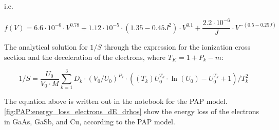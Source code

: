 
i.e.

\begin{equation}
    \label{eq:theory:quantitative:pap:calculation_of_F:dE_d_rho_s:one_over_f_2}
    f(V) = 6.6 \cdot 10^{-6}\cdot V^{0.78} + 1.12\cdot 10^{-5}\cdot (1.35 - 0.45 J^2) \cdot V^{0.1} + \frac{2.2 \cdot 10^{-6}}{J} \cdot V^{-(0.5-0.25J)}
\end{equation}




The analytical solution for $1/S$ through the expression for the ionization cross section and the deceleration of the electrons, where $ T_K = 1 + P_k - m$:

\begin{equation}
    \label{eq:theory:quantitative:pap:calculation_of_F:dE_d_rho_s:analytical}
    1/S = \frac{U_0}{V_0 \cdot M} \sum \limits_{k=1}^{3} D_k \cdot (V_0/U_0)^{P_k} \cdot ((T_k)U_0^{T_k} \cdot \ln(U_0)-U_0^{T_k}+1)/T_k^2
\end{equation}




The equation above is written out in the notebook for the PAP model.
\cref{fig:PAP:energy_loss_electrons_dE_drhos} show the energy loss of the electrons in GaAs, GaSb, and Cu, according to the PAP model.


